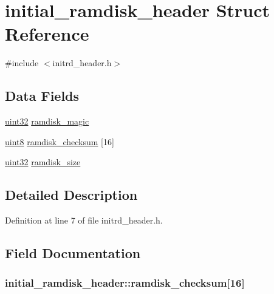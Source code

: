 \hypertarget{structinitial__ramdisk__header}{
\section{initial\_\-ramdisk\_\-header Struct Reference}
\label{structinitial__ramdisk__header}
}


{\ttfamily \#include $<$initrd\_\-header.h$>$}

\subsection*{Data Fields}
\begin{DoxyCompactItemize}
\item 
\hyperlink{int__types_8h_a1134b580f8da4de94ca6b1de4d37975e}{uint32} \hyperlink{structinitial__ramdisk__header_a1c5e82e06d99171a17e0da88f9a4abb2}{ramdisk\_\-magic}
\item 
\hyperlink{int__types_8h_adde6aaee8457bee49c2a92621fe22b79}{uint8} \hyperlink{structinitial__ramdisk__header_a6aca50ecb754b12e1adb1884596783ae}{ramdisk\_\-checksum} \mbox{[}16\mbox{]}
\item 
\hyperlink{int__types_8h_a1134b580f8da4de94ca6b1de4d37975e}{uint32} \hyperlink{structinitial__ramdisk__header_a6a8c51d9c61d606fd922a3a531b7c14f}{ramdisk\_\-size}
\end{DoxyCompactItemize}


\subsection{Detailed Description}


Definition at line 7 of file initrd\_\-header.h.



\subsection{Field Documentation}
\hypertarget{structinitial__ramdisk__header_a6aca50ecb754b12e1adb1884596783ae}{
\subsubsection[{ramdisk\_\-checksum}]{ {\bf initial\_\-ramdisk\_\-header::ramdisk\_\-checksum}\mbox{[}16\mbox{]}}}
\label{structinitial__ramdisk__header_a6aca50ecb754b12e1adb1884596783ae}


